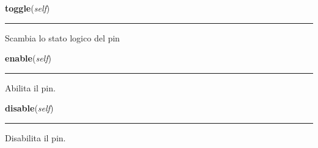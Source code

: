     \label{component:InPin:toggle}

    \vspace{0.5ex}

\hspace{.8\funcindent}\begin{boxedminipage}{\funcwidth}

    \raggedright \textbf{toggle}(\textit{self})

    \vspace{-1.5ex}

    \rule{\textwidth}{0.5\fboxrule}
\setlength{\parskip}{2ex}
    Scambia lo stato logico del pin

\setlength{\parskip}{1ex}
    \end{boxedminipage}

    \label{component:InPin:enable}

    \vspace{0.5ex}

\hspace{.8\funcindent}\begin{boxedminipage}{\funcwidth}

    \raggedright \textbf{enable}(\textit{self})

    \vspace{-1.5ex}

    \rule{\textwidth}{0.5\fboxrule}
\setlength{\parskip}{2ex}
    Abilita il pin.

\setlength{\parskip}{1ex}
    \end{boxedminipage}

    \label{component:InPin:disable}

    \vspace{0.5ex}

\hspace{.8\funcindent}\begin{boxedminipage}{\funcwidth}

    \raggedright \textbf{disable}(\textit{self})

    \vspace{-1.5ex}

    \rule{\textwidth}{0.5\fboxrule}
\setlength{\parskip}{2ex}
    Disabilita il pin.

\setlength{\parskip}{1ex}
    \end{boxedminipage}

